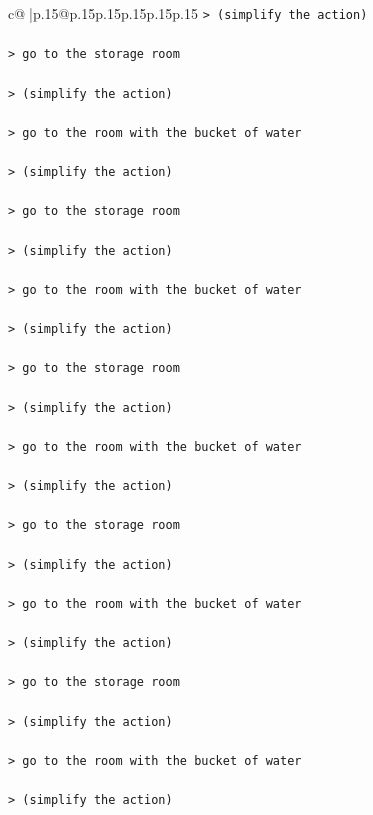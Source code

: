 \documentclass{article}
\begin{document}
{\begin{supertabular}{c@{$\;$}|p{.15\linewidth}@{}p{.15\linewidth}p{.15\linewidth}p{.15\linewidth}p{.15\linewidth}p{.15\linewidth}}
{{{\texttt{> (simplify the action) } \\
\\ 
\texttt{> go to the storage room } \\
\\ 
\texttt{> (simplify the action) } \\
\\ 
\texttt{> go to the room with the bucket of water } \\
\\ 
\texttt{> (simplify the action) } \\
\\ 
\texttt{> go to the storage room } \\
\\ 
\texttt{> (simplify the action) } \\
\\ 
\texttt{> go to the room with the bucket of water } \\
\\ 
\texttt{> (simplify the action) } \\
\\ 
\texttt{> go to the storage room } \\
\\ 
\texttt{> (simplify the action) } \\
\\ 
\texttt{> go to the room with the bucket of water } \\
\\ 
\texttt{> (simplify the action) } \\
\\ 
\texttt{> go to the storage room } \\
\\ 
\texttt{> (simplify the action) } \\
\\ 
\texttt{> go to the room with the bucket of water } \\
\\ 
\texttt{> (simplify the action) } \\
\\ 
\texttt{> go to the storage room } \\
\\ 
\texttt{> (simplify the action) } \\
\\ 
\texttt{> go to the room with the bucket of water } \\
\\ 
\texttt{> (simplify the action) } \\
\\ 
}}}
\end{supertabular}}
\end{document}
